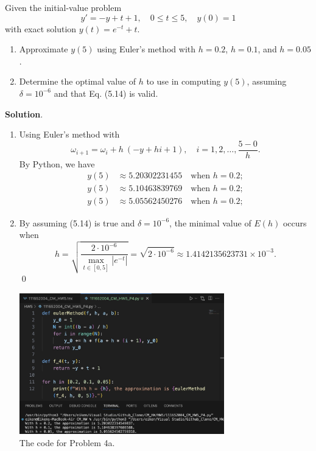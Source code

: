 \documentclass[11pt]{article}
\theoremstyle{break}
\numberwithin{equation}{theorem}
\begin{document}
\newpage
\begin{problem}\label{problem 4} %
    Given the initial-value problem $$y'=-y+t+1, \quad 0\leq t\leq 5, \quad y(0)=1$$ with exact solution $y(t)=e^{-t}+t$.
    \begin{enumerate}
        \item Approximate $y(5)$ using Euler's method with $h = 0.2$, $h = 0.1$, and $h = 0.05$.
        \item Determine the optimal value of $h$ to use in computing $y(5)$, assuming $\delta = 10^{-6}$ and that Eq. (5.14) is valid.
    \end{enumerate}
\end{problem}
\textbf{Solution}. 
\begin{enumerate}
    \item Using Euler's method with \begin{equation*}
        \omega_{i+1}=\omega_i+h\:(-y+hi+1), \quad i=1,2,\dots,\dfrac{5-0}{h}.
    \end{equation*}
    By Python, we have \begin{align*}
        y(5)&\approx5.20302231455\quad\text{when $h=0.2$};\\
        y(5)&\approx5.10463839769\quad\text{when $h=0.2$};\\
        y(5)&\approx5.05562450276\quad\text{when $h=0.2$};
    \end{align*}
    \item By assuming (5.14) is true and $\delta=10^{-6}$, the minimal value of $E(h)$ occurs when $$h=\sqrt{\dfrac{2\cdot10^{-6}}{\max_{t\in[0, 5]}|e^{-t}|}}=\sqrt{2\cdot10^{-6}}\approx1.4142135623731\times10^{-3}.$$ \qed
    \begin{center}
        \includegraphics[width=0.7\textwidth]{P4a.jpg}\\
        The code for Problem 4a.
    \end{center}
\end{enumerate}
\end{document}
